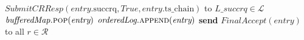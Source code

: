 \begin{algorithm}[!tb]
\begin{algorithmic}[1]
          \State $\textit{SubmitCRResp}(entry.\mathrm{succrq}, True, entry.\mathrm{ts\_chain})$ to $L\_{succrq} \in \mathcal{L}$
          \EndIf
        \State $\textit{bufferedMap}\textsc{.pop}(\textit{entry})$
        \State $\textit{orderedLog}\textsc{.append}(\textit{entry})$
        \State \textbf{send} $\textit{FinalAccept}(\textit{entry})$ to all $r \in \mathcal{R}$
        \EndIf
      \EndProcedure
  \end{algorithmic}
\end{algorithm}
























































